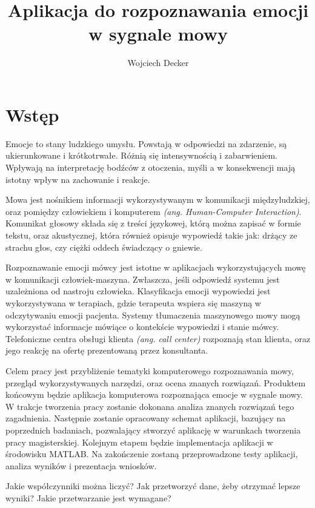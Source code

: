 \documentclass[a4paper,12pt,twoside,openany]{report}
\title{Aplikacja do rozpoznawania emocji w sygnale mowy}
\author{Wojciech Decker}
\newcommand{\ang}[1]{\textit{(ang. #1)}}
\begin{document}
\maketitle
\chapter{Wstęp}
\label{ch:wstep}
Emocje to stany ludzkiego umysłu.
Powstają w odpowiedzi na zdarzenie, są ukierunkowane i krótkotrwałe.
Różnią się intensywnością i zabarwieniem.
Wpływają na interpretację bodźców z otoczenia,
myśli a w konsekwencji mają istotny wpływ na zachowanie i reakcje.

Mowa jest nośnikiem informacji wykorzystywanym w komunikacji międzyludzkiej,
oraz pomiędzy człowiekiem i komputerem \ang{Human-Computer Interaction}.
Komunikat głosowy składa się z treści językowej,
którą można zapisać w formie tekstu,
oraz akustycznej, która również opisuje wypowiedź takie jak:
drżący ze strachu głos, czy ciężki oddech świadczący o gniewie.

Rozpoznawanie emocji mówcy jest istotne w aplikacjach wykorzystujących mowę w komunikacji człowiek-maszyna.
Zwłaszcza, jeśli odpowiedź systemu jest uzależniona od nastroju człowieka.
Klasyfikacja emocji wypowiedzi jest wykorzystywana w terapiach,
gdzie terapeuta wspiera się maszyną w odczytywaniu emocji pacjenta.
Systemy tłumaczenia maszynowego mowy mogą wykorzystać informacje mówiące o kontekście wypowiedzi i stanie mówcy.
Telefoniczne centra obsługi klienta \ang{call center} rozpoznają stan klienta,
oraz jego reakcję na ofertę prezentowaną przez konsultanta.

Celem pracy jest przybliżenie tematyki komputerowego rozpoznawania mowy,
przegląd wykorzystywanych narzędzi, oraz ocena znanych rozwiązań.
Produktem końcowym będzie aplikacja komputerowa rozpoznająca emocje w sygnale mowy.
W trakcje tworzenia pracy zostanie dokonana analiza znanych rozwiązań tego zagadnienia.
Następnie zostanie opracowany schemat aplikacji, bazujący na poprzednich badaniach,
pozwalający stworzyć aplikację w warunkach tworzenia pracy magisterskiej.
Kolejnym etapem będzie implementacja aplikacji w środowisku MATLAB.
Na zakończenie zostaną przeprowadzone testy aplikacji,
analiza wyników i prezentacja wniosków.

Jakie współczynniki można liczyć? 
Jak przetworzyć dane, żeby otrzymać lepsze wyniki?
Jakie przetwarzanie jest wymagane?
\end{document}

